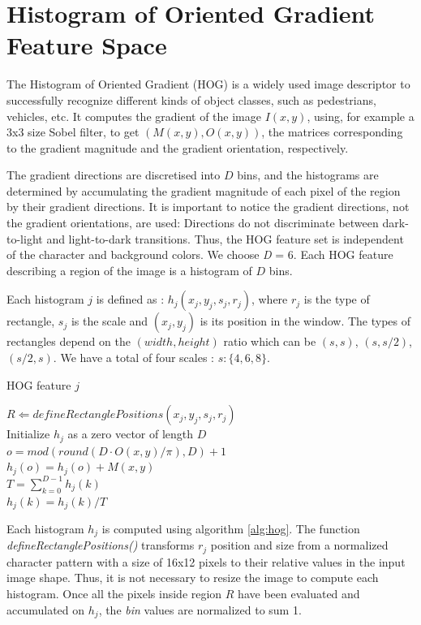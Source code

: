 \documentclass{ipol}
\begin{document}
\section{Histogram of Oriented Gradient Feature Space}
The Histogram of Oriented Gradient (HOG) \cite{Dalal:2005} is a widely used image descriptor to successfully recognize different kinds of object classes, such as pedestrians, vehicles, etc.
It computes the gradient of the image $I(x,y)$, using, for example a 3x3 size Sobel filter, to get $(M(x,y),O(x,y))$, the matrices corresponding to the gradient magnitude and the gradient orientation, respectively.

The gradient directions are discretised into $D$ bins, and the histograms are determined by accumulating the gradient magnitude of each pixel of the region by their gradient directions. 
It is important to notice the gradient directions, not the gradient orientations, are used: Directions do not discriminate between dark-to-light and light-to-dark transitions.
Thus, the HOG feature set is independent of the character and background colors. 
We choose \textit{D} = 6.
Each HOG feature describing a region of the image is a histogram of $D$ bins.

Each histogram $j$ is defined as : $h_j (x_j,y_j,s_j,r_j)$, where $r_j$ is the type of rectangle, $s_j$ is the scale and $(x_j,y_j)$ is its position in the window.
The types of rectangles depend on the $(width,height)$ ratio which can be $(s,s)$, $(s,s/2)$, $(s/2,s)$. We have a total of four scales : $s:\{4,6,8\}$.

\begin{algorithm}[!htbp]
\small
\caption{HOG feature $j$}
\DontPrintSemicolon
{}
$R \Leftarrow defineRectanglePositions(x_j,y_j,s_j,r_j)$ \\
Initialize $h_j$ as a zero vector of length $D$ \\
 {
	$o = mod(round(D \cdot O(x,y)/ \pi),D) + 1$ \\
  $h_j(o) = h_j(o) + M(x,y)$ \\
}    
$T=\sum_{k=0}^{D-1}h_j(k)$ \\
 {$h_j(k) = h_j(k) / T$} 
\label{alg:hog}
\end{algorithm}

Each histogram $h_j$ is computed using algorithm \ref{alg:hog}.
The function \textit{defineRectanglePositions()} transforms $r_j$ position and size from a normalized character pattern with a size of 16x12 pixels to their relative values in the input image shape.
Thus, it is not necessary to resize the image to compute each histogram.
Once all the pixels inside region $R$ have been evaluated and accumulated on $h_j$, the \textit{bin} values are normalized to sum 1.
\end{document}
